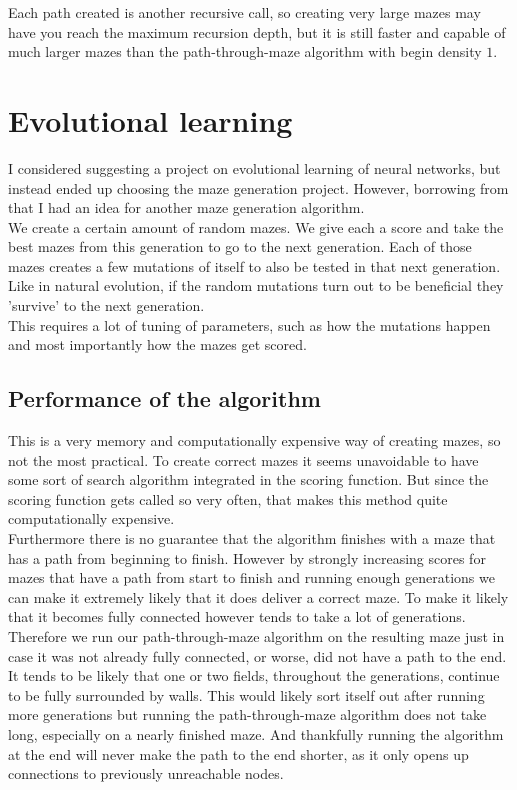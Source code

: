 \documentclass[10pt, a4paper, twoside]{amsart}
\newcommand{\1}{\mathbbm{1}}
\begin{document}
Each path created is another recursive call, so creating very large mazes may have you reach the maximum recursion depth, but it is still faster and capable of much larger mazes than the path-through-maze algorithm with begin density $1$.


\section{Evolutional learning}
I considered suggesting a project on evolutional learning of neural networks, but instead ended up choosing the maze generation project. However, borrowing from that I had an idea for another maze generation algorithm.\\
We create a certain amount of random mazes. We give each a score and take the best mazes from this generation to go to the next generation. Each of those mazes creates a few mutations of itself to also be tested in that next generation. Like in natural evolution, if the random mutations turn out to be beneficial they 'survive' to the next generation.\\
This requires a lot of tuning of parameters, such as how the mutations happen and most importantly how the mazes get scored.

\subsection{Performance of the algorithm}
This is a very memory and computationally expensive way of creating mazes, so not the most practical. To create correct mazes it seems unavoidable to have some sort of search algorithm integrated in the scoring function. But since the scoring function gets called so very often, that makes this method quite computationally 	expensive.\\

Furthermore there is no guarantee that the algorithm finishes with a maze that has a path from beginning to finish. However by strongly increasing scores for mazes that have a path from start to finish and running enough generations we can make it extremely likely that it does deliver a correct maze. To make it likely that it becomes fully connected however tends to take a lot of generations. Therefore we run our path-through-maze algorithm on the resulting maze just in case it was not already fully connected, or worse, did not have a path to the end. It tends to be likely that one or two fields, throughout the generations, continue to be fully surrounded by walls. This would likely sort itself out after running more generations but running the path-through-maze algorithm does not take long, especially on a nearly finished maze. And thankfully running the algorithm at the end will never make the path to the end shorter, as it only opens up connections to previously unreachable nodes.\\
\end{document}
